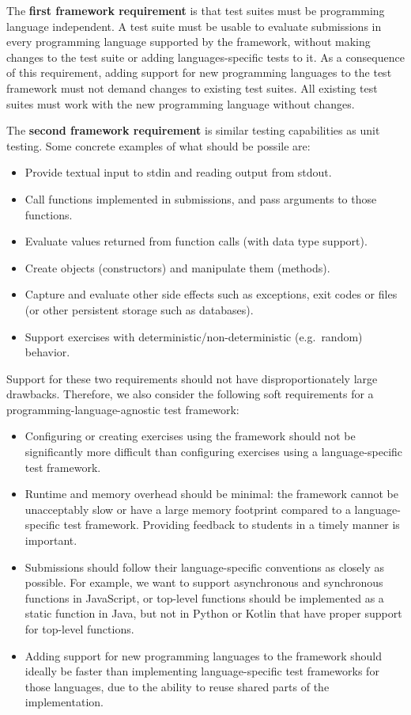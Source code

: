 \documentclass[../main]{subfiles}
\begin{document}
The \textbf{first framework requirement} is that test suites must be programming language independent.
A test suite must be usable to evaluate submissions in every programming language supported by the framework, without making changes to the test suite or adding languages-specific tests to it.
As a consequence of this requirement, adding support for new programming languages to the test framework must not demand changes to existing test suites.
All existing test suites must work with the new programming language without changes.

The \textbf{second framework requirement} is similar testing capabilities as unit testing.
Some concrete examples of what should be possile are:

\begin{itemize}[noitemsep]
    \item Provide textual input to stdin and reading output from stdout.
    \item Call functions implemented in submissions, and pass arguments to those functions.
    \item Evaluate values returned from function calls (with data type support).
    \item Create objects (constructors) and manipulate them (methods).
    \item Capture and evaluate other side effects such as exceptions, exit codes or files (or other persistent storage such as databases).
    \item Support exercises with deterministic/non-deterministic (e.g.\ random) behavior.
\end{itemize}

Support for these two requirements should not have disproportionately large drawbacks.
Therefore, we also consider the following soft requirements for a programming-language-agnostic test framework:

\begin{itemize}
    \item Configuring or creating exercises using the framework should not be significantly more difficult than configuring exercises using a language-specific test framework.
    \item Runtime and memory overhead should be minimal: the framework cannot be unacceptably slow or have a large memory footprint compared to a language-specific test framework. Providing feedback to students in a timely manner is important.
    \item Submissions should follow their language-specific conventions as closely as possible. For example, we want to support asynchronous and synchronous functions in JavaScript, or top-level functions should be implemented as a static function in Java, but not in Python or Kotlin that have proper support for top-level functions.
    \item Adding support for new programming languages to the framework should ideally be faster than implementing language-specific test frameworks for those languages, due to the ability to reuse shared parts of the implementation.
\end{itemize}
\end{document}
